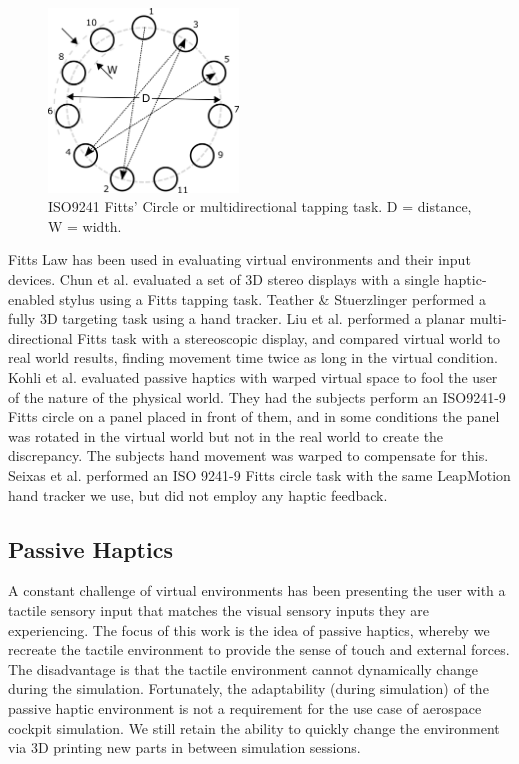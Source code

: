 \documentclass[]{aiaa-tc}%
\begin{document}
\begin{figure}[htb]
  \centering
  \includegraphics[width=0.45\textwidth]{figures/iso9241.png}
  \caption{ISO9241 Fitts' Circle or multidirectional tapping task. D = distance, W = width.}
  \label{fig:circle}
\end{figure}

Fitts Law has been used in evaluating virtual environments and their input devices.
Chun et al.\cite{chun_evaluating_2004} evaluated a set of 3D stereo displays with a single haptic-enabled stylus using a Fitts tapping task.
Teather \& Stuerzlinger\cite{teather_pointing_2011} performed a fully 3D targeting task using a hand tracker.
Liu et al.\cite{liu_comparing_2009} performed a planar multi-directional Fitts task with a stereoscopic display, and compared virtual world to real world results, finding movement time twice as long in the virtual condition.
Kohli et al.\cite{kohli_redirected_2012} evaluated passive haptics with warped virtual space to fool the user of the nature of the physical world.
They had the subjects perform an ISO9241-9 Fitts circle on a panel placed in front of them, and in some conditions the panel was rotated in the virtual world but not in the real world to create the discrepancy.
The subjects hand movement was warped to compensate for this.
Seixas et al.\cite{seixas_one_2015} performed an ISO 9241-9 Fitts circle task with the same LeapMotion hand tracker we use, but did not employ any haptic feedback.

\subsection{Passive Haptics}
A constant challenge of virtual environments has been presenting the user with a tactile sensory input that matches the visual sensory inputs they are experiencing.
The focus of this work is the idea of passive haptics, whereby we recreate the tactile environment to provide the sense of touch and external forces.
The disadvantage is that the tactile environment cannot dynamically change during the simulation.
Fortunately, the adaptability (during simulation) of the passive haptic environment is not a requirement for the use case of aerospace cockpit simulation.
We still retain the ability to quickly change the environment via 3D printing new parts in between simulation sessions.
\end{document}
